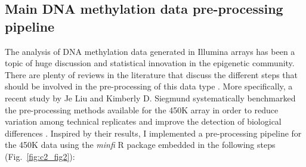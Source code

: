 \smallskip

\subsection{Main DNA methylation data pre-processing pipeline} \label{s:2.1.2}

\smallskip

The analysis of DNA methylation data generated in Illumina arrays has been a topic of huge discussion and statistical innovation in the epigenetic community. There are plenty of reviews in the literature that discuss the different steps that should be involved in the pre-processing of this data type \cite{Wilhelm-Benartzi2013,Morris2015,Liu2016}. More specifically, a recent study by Je Liu and Kimberly D. Siegmund systematically benchmarked the pre-processing methods available for the 450K array in order to reduce variation among technical replicates and improve the detection of biological differences \cite{Liu2016}. Inspired by their results, I implemented a pre-processing pipeline for the 450K data using the \textit{minfi} R package \cite{Aryee2014} embedded in the following steps (Fig.~\ref{fig:c2_fig2}):

